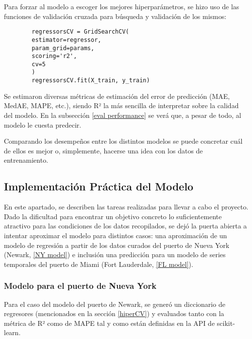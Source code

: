 \documentclass[12pt]{article}
\begin{document}
	Para forzar al modelo a escoger los mejores hiperparámetros, se hizo uso de las funciones de validación cruzada para búsqueda y validación de los mismos:
	
	\begin{verbatim}
		regressorsCV = GridSearchCV(
		estimator=regressor,
		param_grid=params,
		scoring='r2',
		cv=5
		)
		regressorsCV.fit(X_train, y_train)
	\end{verbatim}

	Se estimaron diversas métricas de estimación del error de predicción (MAE, MedAE, MAPE, etc.), siendo R² la más sencilla de interpretar sobre la calidad del modelo. En la subsección \ref{eval performance} se verá que, a pesar de todo, al modelo le cuesta predecir.
	
	Comparando los desempeños entre los distintos modelos se puede concretar cuál de ellos es mejor o, simplemente, hacerse una idea con los datos de entrenamiento.
	
	\subsection{\label{implementacionPractica}Implementación Práctica del Modelo}
 	En este apartado, se describen las tareas realizadas para llevar a cabo el proyecto. Dado la dificultad para encontrar un objetivo concreto lo suficientemente atractivo para las condiciones de los datos recopilados, se dejó la puerta abierta a intentar aproximar el modelo para distintos casos: una aproximación de un modelo de regresión a partir de los datos curados del puerto de Nueva York (Newark, \ref{NY model}) e inclusión una predicción para un modelo de series temporales del puerto de Miami (Fort Lauderdale, \ref{FL model}).
 	
 	\subsubsection{\label{NY model} Modelo para el puerto de Nueva York}
 	Para el caso del modelo del puerto de Newark, se generó un diccionario de regresores (mencionados en la sección \ref{hiperCV}) y evaluados tanto con la métrica de R² como de MAPE tal y como están definidas en la API de scikit-learn.
 	
\end{document}

